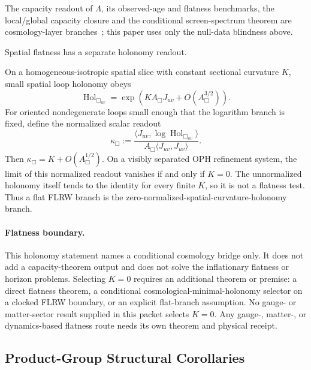 The capacity readout of \(\Lambda\), its observed-age and flatness benchmarks, the
local/global capacity closure and the conditional screen-spectrum theorem are cosmology-layer
branches~\cite{ophdesittershock}; this paper uses only the null-data blindness above.

Spatial flatness has a separate holonomy readout.

\begin{lemma}
On a homogeneous-isotropic spatial slice with constant sectional curvature \(K\), small spatial
loop holonomy obeys
\[
\operatorname{Hol}_{\Box_{uv}}=\exp\!\left(KA_\Box J_{uv}+O(A_\Box^{3/2})\right).
\]
For oriented nondegenerate loops small enough that the logarithm branch is
fixed, define the normalized scalar readout
\[
\kappa_\Box
:=
\frac{\langle J_{uv},\log\operatorname{Hol}_{\Box_{uv}}\rangle}
     {A_\Box\langle J_{uv},J_{uv}\rangle}.
\]
Then \(\kappa_\Box=K+O(A_\Box^{1/2})\). On a visibly separated OPH refinement
system, the limit of this normalized readout vanishes if and only if \(K=0\).
The unnormalized holonomy itself tends to the identity for every finite
\(K\), so it is not a flatness test. Thus a flat FLRW branch is the
zero-normalized-spatial-curvature-holonomy branch.
\end{lemma}

\paragraph{Flatness boundary.}
This holonomy statement names a conditional cosmology bridge only. It does not add a capacity-theorem
output and does not solve the inflationary flatness or horizon problems. Selecting \(K=0\) requires
an additional theorem or premise: a direct flatness theorem, a conditional
cosmological-minimal-holonomy selector on a clocked FLRW boundary, or an explicit flat-branch
assumption. No gauge- or matter-sector result supplied in this packet selects
\(K=0\). Any gauge-, matter-, or dynamics-based flatness route needs its own
theorem and physical receipt.

\fi
\ifdefined\OPHSkipStandardModelChain
\else
\subsection{Product-Group Structural Corollaries}

